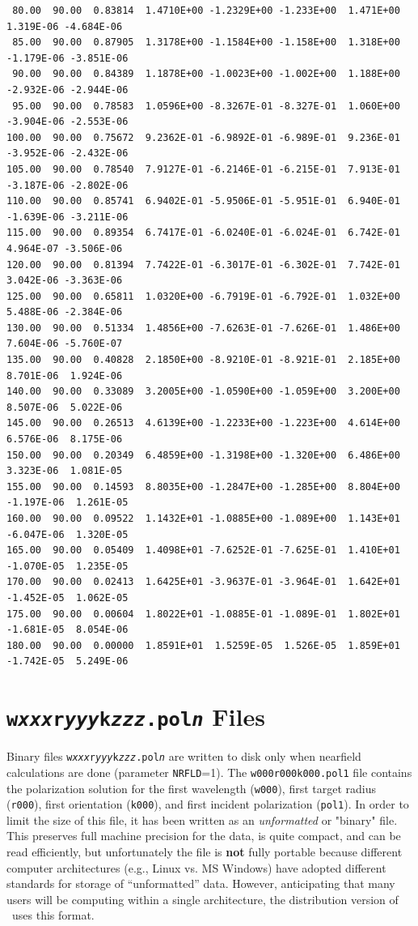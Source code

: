 \begin{appendix}
{\begin{verbatim}
 80.00  90.00  0.83814  1.4710E+00 -1.2329E+00 -1.233E+00  1.471E+00  1.319E-06 -4.684E-06
 85.00  90.00  0.87905  1.3178E+00 -1.1584E+00 -1.158E+00  1.318E+00 -1.179E-06 -3.851E-06
 90.00  90.00  0.84389  1.1878E+00 -1.0023E+00 -1.002E+00  1.188E+00 -2.932E-06 -2.944E-06
 95.00  90.00  0.78583  1.0596E+00 -8.3267E-01 -8.327E-01  1.060E+00 -3.904E-06 -2.553E-06
100.00  90.00  0.75672  9.2362E-01 -6.9892E-01 -6.989E-01  9.236E-01 -3.952E-06 -2.432E-06
105.00  90.00  0.78540  7.9127E-01 -6.2146E-01 -6.215E-01  7.913E-01 -3.187E-06 -2.802E-06
110.00  90.00  0.85741  6.9402E-01 -5.9506E-01 -5.951E-01  6.940E-01 -1.639E-06 -3.211E-06
115.00  90.00  0.89354  6.7417E-01 -6.0240E-01 -6.024E-01  6.742E-01  4.964E-07 -3.506E-06
120.00  90.00  0.81394  7.7422E-01 -6.3017E-01 -6.302E-01  7.742E-01  3.042E-06 -3.363E-06
125.00  90.00  0.65811  1.0320E+00 -6.7919E-01 -6.792E-01  1.032E+00  5.488E-06 -2.384E-06
130.00  90.00  0.51334  1.4856E+00 -7.6263E-01 -7.626E-01  1.486E+00  7.604E-06 -5.760E-07
135.00  90.00  0.40828  2.1850E+00 -8.9210E-01 -8.921E-01  2.185E+00  8.701E-06  1.924E-06
140.00  90.00  0.33089  3.2005E+00 -1.0590E+00 -1.059E+00  3.200E+00  8.507E-06  5.022E-06
145.00  90.00  0.26513  4.6139E+00 -1.2233E+00 -1.223E+00  4.614E+00  6.576E-06  8.175E-06
150.00  90.00  0.20349  6.4859E+00 -1.3198E+00 -1.320E+00  6.486E+00  3.323E-06  1.081E-05
155.00  90.00  0.14593  8.8035E+00 -1.2847E+00 -1.285E+00  8.804E+00 -1.197E-06  1.261E-05
160.00  90.00  0.09522  1.1432E+01 -1.0885E+00 -1.089E+00  1.143E+01 -6.047E-06  1.320E-05
165.00  90.00  0.05409  1.4098E+01 -7.6252E-01 -7.625E-01  1.410E+01 -1.070E-05  1.235E-05
170.00  90.00  0.02413  1.6425E+01 -3.9637E-01 -3.964E-01  1.642E+01 -1.452E-05  1.062E-05
175.00  90.00  0.00604  1.8022E+01 -1.0885E-01 -1.089E-01  1.802E+01 -1.681E-05  8.054E-06
180.00  90.00  0.00000  1.8591E+01  1.5259E-05  1.526E-05  1.859E+01 -1.742E-05  5.249E-06
\end{verbatim}
}
\newpage\section{{\tt w{\it xxx}r{\it yyy}k{\it zzz}.pol{\it n}} Files
	\label{app:w000r000k000.poln}}

Binary files {\tt w{\it xxx}r{\it yyy}k{\it zzz}.pol{\it n}} are written to disk
only when nearfield calculations are done (parameter {\tt NRFLD}=1).
The {\tt w000r000k000.pol1} file contains the polarization solution for the
first wavelength ({\tt w000}), first target radius ({\tt r000}),
first orientation ({\tt k000}), and first incident polarization ({\tt pol1}).
In order to limit the size of this file, it has been written as an
{\it unformatted} or "binary" file.  
This preserves full machine precision for the data, is quite compact,
and can be read efficiently, but unfortunately the file is {\bf not}
fully portable because 
different computer architectures (e.g., Linux vs. MS Windows)
have adopted different standards for storage of ``unformatted'' data.
However, anticipating that many users will be computing within a single
architecture, the distribution version of \ddscat\ uses this format.


\end{appendix}
